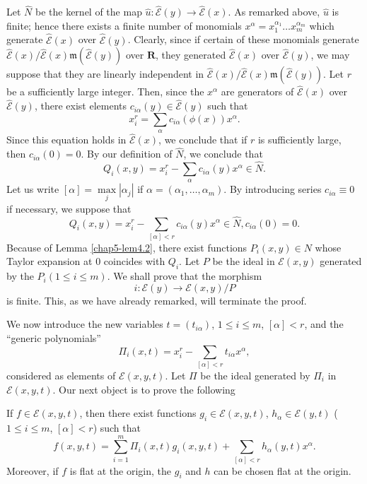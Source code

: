 Let $\widehat{N}$ be the kernel of the map $\widehat{u} : \widehat{\mathscr{E}} (y ) \to \widehat{\mathscr{E}} (x)$. As remarked above, $\widehat{u}$ is finite; hence there exists a finite number of monomials $x^{\alpha} = x^{\alpha_1}_1 \ldots x^{\alpha_m}_m$ which generate $\widehat{\mathscr{E}}(x)$ over $\widehat{\mathscr{E}}(y)$. Clearly, since if certain of these monomials generate $\widehat{\mathscr{E}}(x)/\widehat{\mathscr{E}}(x)\mathfrak{m}(\widehat{\mathscr{E}}(y))$ over $\mathbf{R}$, they generated $\widehat{\mathscr{E}}(x)$ over $\widehat{\mathscr{E}}(y)$, we may suppose that they are linearly independent in $\widehat{\mathscr{E}}(x)/ \widehat{\mathscr{E}}(x) \mathfrak{m}(\widehat{\mathscr{E}}(y))$. Let $r$ be a sufficiently large integer. Then, since the $x^{\alpha}$ are generators of $\widehat{\mathscr{E}}(x)$ over $\widehat{\mathscr{E}}(y)$, there exist elements $c_{i\alpha}(y) \in\widehat{\mathscr{E}}(y)$ such that
$$
x^r_i = \sum\limits_{\alpha} c_{i\alpha} (\phi (x)) x^{\alpha}.
$$
Since this equation holds in $\widehat{\mathscr{E}} (x)$, we conclude that if $r$ is sufficiently large, then $c_{i\alpha} (0) = 0$. By our definition of $\widehat{N}$, we conclude that 
$$
Q_i (x,y) = x^r_i - \sum\limits_{\alpha} c_{i \alpha} (y) x^{\alpha}  \in \widehat{N}.
$$
Let us write $[\alpha] = \max\limits_{j} |\alpha_j|$  if $\alpha = (\alpha_1, \ldots, \alpha_m)$. By introducing series $c_{i\alpha} \equiv 0$ if necessary, we suppose that 
$$
Q_i (x, y) = x^r_i - \sum\limits_{[\alpha] < r} c_{i \alpha } (y) x^{\alpha} \in \widehat{N}, c_{i\alpha} (0) = 0.
$$
Because of Lemma \ref{chap5-lem4.2}, there exist functions $P_i (x,y) \in N$ whose Taylor expansion at 0 coincides with $Q_i$. Let $P$ be the ideal in $\mathscr{E}(x,y)$ generated by the $P_i (1 \leq i \leq m)$. We shall prove that the morphism
$$
i  : \mathscr{E} (y) \to  \mathscr{E} (x, y) / P
$$
is finite. This, as we have already remarked, will terminate the proof.

We now introduce the new variables $t = (t_{i\alpha})$, $1 \leq i \leq m$, $[\alpha] < r$, and the ``generic polynomials''
$$
\Pi_i (x,t) = x^{r}_i - \sum\limits_{[\alpha] < r} t_{i\alpha} x^{\alpha},
$$\pageoriginale
considered as elements of $\mathscr{E}(x,y,t)$. Let $\Pi$ be the ideal generated by $\Pi_i$ in $\mathscr{E} (x,y,t)$. Our next object is to prove the following

\begin{lemma}\label{chap5-lem4.3}
  If $f \in \mathscr{E} (x,y,t)$, then there exist functions $g_i \in \mathscr{E}(x, y, t)$, $h_\alpha  \in \mathscr{E}(y,t)$ ($1 \leq i \leq m$, $[\alpha] < r$) such that
  \begin{equation*}
    f(x,y,t) = \sum\limits^{m}_{i=1} \Pi_i (x,t) g_i (x,y,t) + \sum\limits_{[\alpha] < r} h_\alpha (y, t) x^{\alpha}. \tag{4.1}\label{chap5-eq4.1}
  \end{equation*}
  Moreover, if $f$ is flat at the origin, the $g_i$ and $h$ can be chosen flat at the origin.
\end{lemma}


